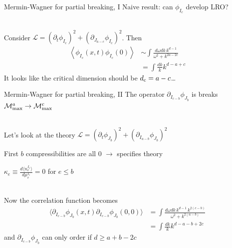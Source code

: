 \documentclass{beamer}
\renewcommand{\L}{\mathcal{L}}
\newcommand{\M}[1]{\mathcal{M}_{\rm max}^{#1}}
\newcommand{\I}[1]{{I_{#1}}}
\newcommand{\J}[1]{{J_{#1}}}
\begin{document}
\begin{frame}{Mermin-Wagner for partial breaking, I}
Naive result: can $\phi_\I{c}$ develop LRO?\\\

Consider $\L = (\partial_t \phi_\I{c})^2 + (\partial_\J{a-c} \phi_\I{c})^2$. Then
\begin{align*}
\left \langle \phi_\I{c} (x,t) \phi_\I{c} (0) \right \rangle &\sim \int \frac{d\omega dk\, k^{d-1}}{\omega^2 + k^{2a-2c}}\\
&= \int \frac{dk}{k} k^{d-a+c}
\end{align*}
It looks like the critical dimension should be $d_{\rm c} = a-c$\dots
\end{frame}

\begin{frame}{Mermin-Wagner for partial breaking, II}
The operator $\partial_\I{c-b} \phi_\J{b}$ is breaks $\M{a} \rightarrow \M{c}$\\\

Let's look at the theory $\L = (\partial_t \phi_\J{b})^2 + (\partial_\I{a-b} \phi_\J{b})^2$

\setlength{\leftskip}{1cm}

First $b$ compressibilities are all 0 $\rightarrow$ specifies theory

$\kappa_e \equiv \frac{d \langle n_e^\I{e} \rangle}{d \mu_e^\I{e}}=0$ for $e\le b$\\\

\setlength{\leftskip}{0cm}

Now the correlation function becomes
\begin{align*}
\langle \partial_\I{c-b} \phi_\J{b} (x,t) \partial_\I{c-b} \phi_\J{b} (0,0) \rangle &= \int \frac{d\omega dk\,k^{d-1}\, k^{2(c-b)}}{ \omega^2 + k^{2(a-b)}}\\
&= \int \frac{dk}{k}k^{d-a-b+2c}
\end{align*}
and $\partial_\I{c-b} \phi_\J{b}$ can only order if $d \ge a+b-2c$
\end{frame}
\end{document}
